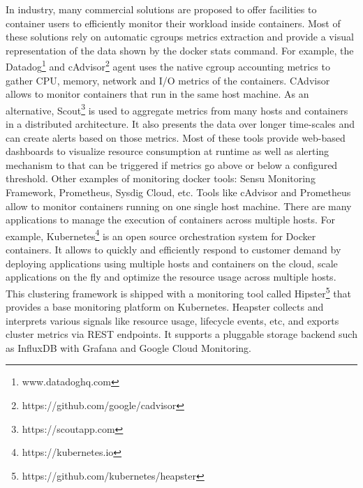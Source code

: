 In industry, many commercial solutions are proposed to offer facilities to container users to efficiently monitor their workload inside containers. Most of these solutions rely on automatic cgroups metrics extraction and provide a visual representation of the data shown by the docker stats command. For example, the Datadog\footnote{www.datadoghq.com} and cAdvisor\footnote{https://github.com/google/cadvisor} agent uses the native cgroup accounting metrics to gather CPU, memory, network and I/O metrics of the containers. CAdvisor allows to monitor containers that run in the same host machine. As an alternative, Scout\footnote{https://scoutapp.com} is used to aggregate metrics from many hosts and containers in a distributed architecture. It also presents the data over longer time-scales and can create alerts based on those metrics. 
Most of these tools provide web-based dashboards to visualize resource consumption at runtime as well as alerting mechanism to that can be triggered if metrics go above or below a configured threshold. Other examples of monitoring docker tools: Sensu Monitoring Framework, Prometheus, Sysdig Cloud, etc.
Tools like cAdvisor and Prometheus allow to monitor containers running on one single host machine. 
There are many applications to manage the execution of containers across multiple hosts. For example, Kubernetes\footnote{https://kubernetes.io} is an open source orchestration system for Docker containers. It allows to quickly and efficiently respond to customer demand by deploying applications using multiple hosts and containers on the cloud, scale applications on the fly and optimize the resource usage across multiple hosts. This clustering framework is shipped with a monitoring tool called Hipster\footnote{https://github.com/kubernetes/heapster} that provides a base monitoring platform on Kubernetes. Heapster collects and interprets various signals like resource usage, lifecycle events, etc, and exports cluster metrics via REST endpoints. It supports a pluggable storage backend such as InfluxDB with Grafana and Google Cloud Monitoring.


